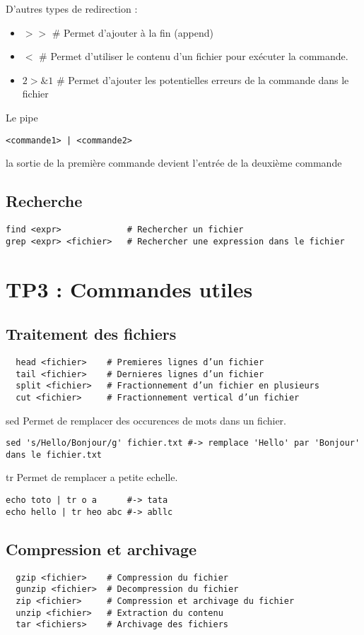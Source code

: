 \documentclass{article}
\begin{document}
D'autres types de redirection :

\begin{itemize}
  \item $>>$    \# Permet d'ajouter à la fin (append)
  \item $<$    \# Permet d'utiliser le contenu d'un fichier pour exécuter la commande.
  \item $2>\&1$ \# Permet d'ajouter les potentielles erreurs de la commande dans le fichier
\end{itemize}

Le pipe 
\begin{lstlisting}
<commande1> | <commande2>
\end{lstlisting}
 la sortie de la première commande devient l'entrée de la deuxième commande

\subsection{Recherche}
\begin{lstlisting}
find <expr>             # Rechercher un fichier
grep <expr> <fichier>   # Rechercher une expression dans le fichier
\end{lstlisting}

\section{TP3 : Commandes utiles}

\subsection{Traitement des fichiers}
\begin{lstlisting}
  head <fichier>    # Premieres lignes d’un fichier
  tail <fichier>    # Dernieres lignes d’un fichier
  split <fichier>   # Fractionnement d’un fichier en plusieurs
  cut <fichier>     # Fractionnement vertical d’un fichier  
\end{lstlisting}

sed
Permet de remplacer des occurences de mots dans un fichier.
\begin{lstlisting}
sed 's/Hello/Bonjour/g' fichier.txt #-> remplace 'Hello' par 'Bonjour' dans le fichier.txt
\end{lstlisting}

tr
Permet de remplacer a petite echelle.

\begin{lstlisting}
echo toto | tr o a      #-> tata
echo hello | tr heo abc #-> abllc
\end{lstlisting}

\subsection{Compression et archivage}
\begin{lstlisting}
  gzip <fichier>    # Compression du fichier
  gunzip <fichier>  # Decompression du fichier
  zip <fichier>     # Compression et archivage du fichier
  unzip <fichier>   # Extraction du contenu
  tar <fichiers>    # Archivage des fichiers
\end{lstlisting}
\end{document}
